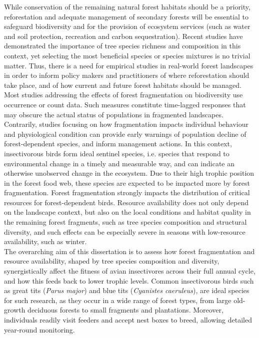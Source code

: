 \documentclass[10pt, twoside]{book} %
\begin{document}
While conservation of the remaining natural forest habitats should be a priority, reforestation and adequate management of secondary forests will be essential to safeguard biodiversity and for the provision of ecosystem services (such as water and soil protection, recreation and carbon sequestration). Recent studies have demonstrated the importance of tree species richness and composition in this context, yet selecting the most beneficial species or species mixtures is no trivial matter. Thus, there is a need for empirical studies in real-world forest landscapes in order to inform policy makers and practitioners of where reforestation should take place, and of how current and future forest habitats should be managed.
Most studies addressing the effects of forest fragmentation on biodiversity use occurrence or count data. Such measures constitute time-lagged responses that may obscure the actual status of populations in fragmented landscapes. Contrarily, studies focusing on how fragmentation impacts individual behaviour and physiological condition can provide early warnings of population decline of forest-dependent species, and inform management actions. In this context, insectivorous birds form ideal sentinel species, i.e. species that respond to environmental change in a timely and measurable way, and can indicate an otherwise unobserved change in the ecosystem. Due to their high trophic position in the forest food web, these species are expected to be impacted more by forest fragmentation. Forest fragmentation strongly impacts the distribution of critical resources for forest-dependent birds. Resource availability does not only depend on the landscape context, but also on the local conditions and habitat quality in the remaining forest fragments, such as tree species composition and structural diversity, and such effects can be especially severe in seasons with low-resource availability, such as winter.\\

The overarching aim of this dissertation is to assess how forest fragmentation and resource availability, shaped by tree species composition and diversity, synergistically affect the fitness of avian insectivores across their full annual cycle, and how this feeds back to lower trophic levels. Common insectivorous birds such as great tits (\textit{Parus major}) and blue tits (\textit{Cyanistes caeruleus}), are ideal species for such research, as they occur in a wide range of forest types, from large old-growth deciduous forests to small fragments and plantations. Moreover, individuals readily visit feeders and accept nest boxes to breed, allowing detailed year-round monitoring.\\
\end{document}
